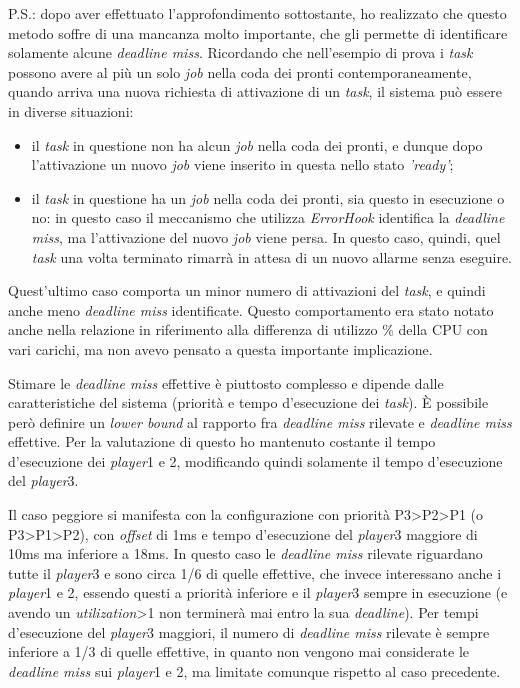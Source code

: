 \documentclass{article}
\begin{document}
P.S.: dopo aver effettuato l'approfondimento sottostante, ho realizzato che questo metodo soffre di una mancanza molto importante, che gli permette di identificare solamente alcune \textit{deadline miss}. Ricordando che nell'esempio di prova i \textit{task} possono avere al più un solo \textit{job} nella coda dei pronti contemporaneamente, quando arriva una nuova richiesta di attivazione di un \textit{task}, il sistema può essere in diverse situazioni:
\begin{itemize}
	\item il \textit{task} in questione non ha alcun \textit{job} nella coda dei pronti, e dunque dopo l'attivazione un nuovo \textit{job} viene inserito in questa nello stato \textit{'ready'};
	\item il \textit{task} in questione ha un \textit{job} nella coda dei pronti, sia questo in esecuzione o no: in questo caso il meccanismo che utilizza \textit{ErrorHook} identifica la \textit{deadline miss}, ma l'attivazione del nuovo \textit{job} viene persa. In questo caso, quindi, quel \textit{task} una volta terminato rimarrà in attesa di un nuovo allarme senza eseguire.
\end{itemize}
Quest'ultimo caso comporta un minor numero di attivazioni del \textit{task}, e quindi anche meno \textit{deadline miss} identificate. Questo comportamento era stato notato anche nella relazione in riferimento alla differenza di utilizzo \% della CPU con vari carichi, ma non avevo pensato a questa importante implicazione.

Stimare le \textit{deadline miss} effettive è piuttosto complesso e dipende dalle caratteristiche del sistema (priorità e tempo d'esecuzione dei \textit{task}). È possibile però definire un \textit{lower bound} al rapporto fra \textit{deadline miss} rilevate e \textit{deadline miss} effettive. Per la valutazione di questo ho mantenuto costante il tempo d'esecuzione dei \textit{player}1 e 2, modificando quindi solamente il tempo d'esecuzione del \textit{player}3.

Il caso peggiore si manifesta con la configurazione con priorità P3>P2>P1 (o P3>P1>P2), con \textit{offset} di 1ms e tempo d'esecuzione del \textit{player}3 maggiore di 10ms ma inferiore a 18ms. In questo caso le \textit{deadline miss} rilevate riguardano tutte il \textit{player}3 e sono circa 1/6 di quelle effettive, che invece interessano anche i \textit{player}1 e 2, essendo questi a priorità inferiore e il \textit{player}3 sempre in esecuzione (e avendo un \textit{utilization}>1 non terminerà mai entro la sua \textit{deadline}). Per tempi d'esecuzione del \textit{player}3 maggiori, il numero di \textit{deadline miss} rilevate è sempre inferiore a 1/3 di quelle effettive, in quanto non vengono mai considerate le \textit{deadline miss} sui \textit{player}1 e 2, ma limitate comunque rispetto al caso precedente.
\end{document}
